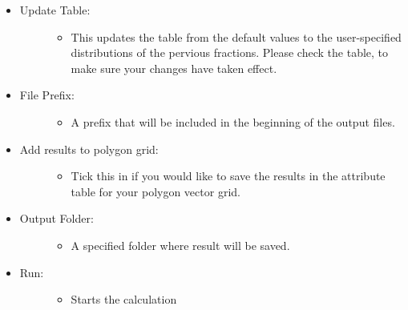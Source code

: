 \documentclass[letterpaper,10pt,english]{sphinxmanual}
\begin{document}
\begin{itemize}
\item {} \begin{description}
\item[{Update Table:}] \leavevmode\begin{itemize}
\item {} 
This updates the table from the default values to the user-specified distributions of the pervious fractions. Please check the table, to make sure your changes have taken effect.

\end{itemize}

\end{description}

\item {} \begin{description}
\item[{File Prefix:}] \leavevmode\begin{itemize}
\item {} 
A prefix that will be included in the beginning of the output files.

\end{itemize}

\end{description}

\item {} \begin{description}
\item[{Add results to polygon grid:}] \leavevmode\begin{itemize}
\item {} 
Tick this in if you would like to save the results in the attribute table for your polygon vector grid.

\end{itemize}

\end{description}

\item {} \begin{description}
\item[{Output Folder:}] \leavevmode\begin{itemize}
\item {} 
A specified folder where result will be saved.

\end{itemize}

\end{description}

\item {} \begin{description}
\item[{Run:}] \leavevmode\begin{itemize}
\item {} 
Starts the calculation


\end{itemize}
\end{description}
\end{itemize}
\end{document}
